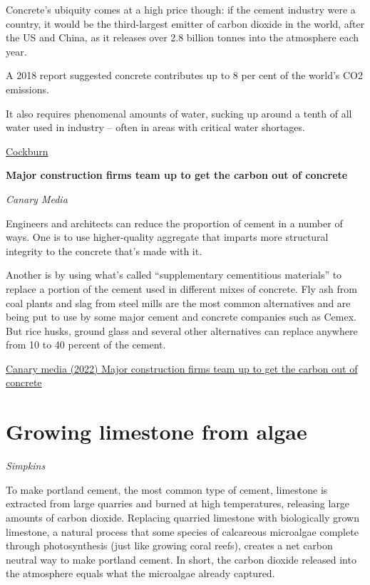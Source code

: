 \documentclass[
]{book}
\begin{document}
Concrete's ubiquity comes at a high price though: if the cement industry were a country, it would be the third-largest emitter of carbon dioxide in the world, after the US and China, as it releases over 2.8 billion tonnes into the atmosphere each year.

A 2018 report suggested concrete contributes up to 8 per cent of the world's CO2 emissions.

It also requires phenomenal amounts of water, sucking up around a tenth of all water used in industry -- often in areas with critical water shortages.

\href{https://www.independent.co.uk/climate-change/news/wood-construction-concrete-steel-climate-b1796342.html}{Cockburn}

\textbf{Major construction firms team up to get the carbon out of concrete}

\emph{Canary Media}

Engineers and architects can reduce the proportion of cement in a number of ways.
One is to use higher-quality aggregate that imparts more structural integrity to the concrete that's made with it.

Another is by using what's called \hspace{0pt}``supplementary cementitious materials'' to replace a portion of the cement used in different mixes of concrete. Fly ash from coal plants and slag from steel mills are the most common alternatives and are being put to use by some major cement and concrete companies such as Cemex. But rice husks, ground glass and several other alternatives can replace anywhere from 10 to 40 percent of the cement.

\href{https://www.canarymedia.com/articles/clean-industry/major-construction-firms-team-up-to-get-the-carbon-out-of-concrete}{Canary media (2022) Major construction firms team up to get the carbon out of concrete}

\hypertarget{growing-limestone-from-algae}{%
\section{Growing limestone from algae}\label{growing-limestone-from-algae}}

\emph{Simpkins}

To make portland cement, the most common type of cement, limestone is extracted from large quarries and burned at high temperatures, releasing large amounts of carbon dioxide.
Replacing quarried limestone with biologically grown limestone, a natural process that some species of calcareous microalgae complete through photosynthesis (just like growing coral reefs), creates a net carbon neutral way to make portland cement. In short, the carbon dioxide released into the atmosphere equals what the microalgae already captured.
\end{document}
